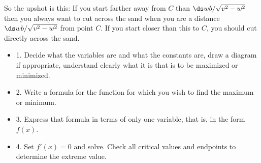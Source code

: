 \begin{example}
So the upshot is this: If you start farther away from $C$ than
$\ds wb/\sqrt{v^2-w^2}$ then you always want to cut across the sand 
when you are a distance $\ds wb/\sqrt{v^2-w^2}$ from point $C$. If you
start closer than this to $C$, you should cut directly across the sand.
\end{example}
\label{exam:sand and road}


\begin{itemize} %

\item{1.} Decide what the variables are and what the constants are, draw a
diagram if appropriate, understand clearly what it is that is to be
maximized or minimized.

\item{2.} Write a formula for the function for which you wish to find 
the maximum or minimum.

\item{3.} Express that formula in terms of only one variable, that is, in
the form $f(x)$.

\item{4.} Set $f'(x)=0$ and solve. Check all critical values and
  endpoints to determine the extreme value.

\end{itemize}

